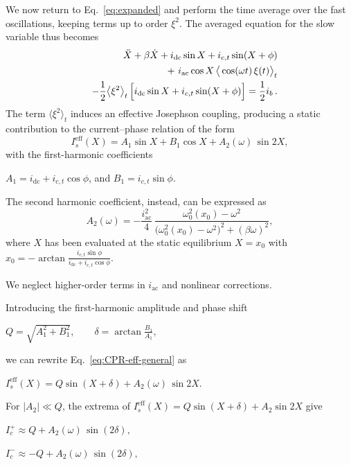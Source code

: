 \documentclass[prl,twocolumn,superscriptaddress,showpacs,nofootinbib]{revtex4-2}
\begin{document}
We now return to Eq.~\eqref{eq:expanded} and perform the time average over the
fast oscillations, keeping terms up to order $\xi^2$. The averaged equation for the slow variable thus becomes
\begin{eqnarray*}
&&\ddot X + \beta \dot X
+ i_{\mathrm{dc}}\sin X + i_{c,t}\sin(X+\phi) \\
&&+\ i_{\rm ac}\cos X\,\big\langle \cos(\omega t)\,\xi(t)\big\rangle_t \\
&& - \frac{1}{2}\big\langle\xi^2\big\rangle_t\,
\Big[i_{\mathrm{dc}}\sin X + i_{c,t} \sin(X+\phi)\Big]
= \frac{1}{2} i_b \,.
\label{eq:slow-eq}
\end{eqnarray*}
The term $\langle\xi^2\rangle_t$ induces an effective Josephson coupling, producing a static contribution to the current–phase relation of the form
\begin{equation}
I_s^{\mathrm{eff}}(X)
= A_1 \sin X + B_1\cos X + A_2(\omega)\,\sin 2X,
\label{eq:CPR-eff-general}
\end{equation}
with the first-harmonic coefficients

$A_1 = i_{\mathrm{dc}} + i_{c,t}\cos\phi$, and
$B_1 = i_{c,t}\sin\phi$.






The second harmonic coefficient, instead, can be expressed as
\begin{equation}
A_2(\omega)=
-\frac{i_{\mathrm{ac}}^2}{4}\,
\frac{\omega_0^2(x_0)-\omega^2}{\big(\omega_0^2(x_0)-\omega^2\big)^2+(\beta\omega)^2},
\label{eq:A2-corr}
\end{equation}
where $X$ has been evaluated at the static equilibrium $X=x_0$ with $x_0=-\arctan\!\frac{i_{c,t}\sin\phi}{i_{\mathrm{dc}}+i_{c,t}\cos\phi}$.

We neglect higher-order terms in $i_{\mathrm{ac}}$ and nonlinear corrections.

Introducing the first-harmonic amplitude and phase shift

$Q = \sqrt{A_1^2+B_1^2},\qquad
\delta = \arctan\!\frac{B_1}{A_1},$


we can rewrite Eq.~\eqref{eq:CPR-eff-general} as

$I_s^{\mathrm{eff}}(X)
= Q\sin(X+\delta) + A_2(\omega)\,\sin 2X $.


For $|A_2|\ll Q$, the extrema of
$I_s^{\mathrm{eff}}(X)=Q\sin(X+\delta)+A_2\sin2X$ give

$I_c^+ \approx Q + A_2(\omega)\,\sin(2\delta),
$

$I_c^- \approx -Q + A_2(\omega)\,\sin(2\delta),$
\end{document}
